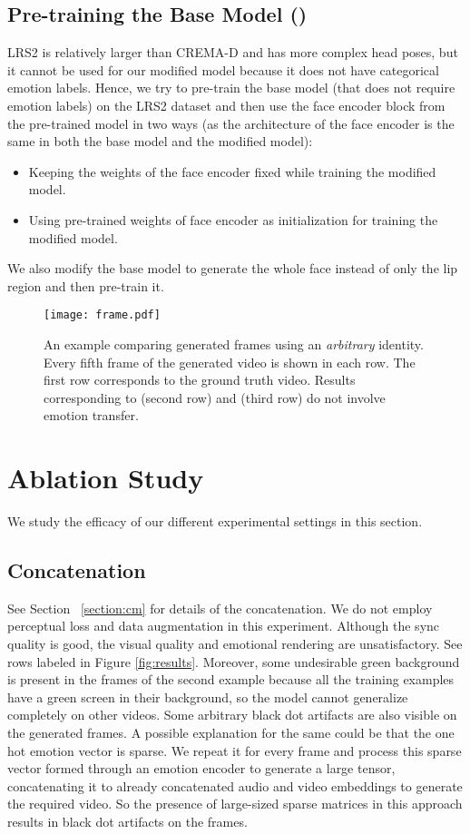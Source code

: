 \documentclass[accepted]{uai2023}
\begin{document}
\subsection{Pre-training the Base Model ()}
\label{section:pbm}
LRS2 \citep{afouras2018deep} is relatively larger than CREMA-D \citep{cao2014crema} and has more complex head poses, but it cannot be used for our modified model because it does not have categorical emotion labels. Hence, we try to pre-train the base model (that does not require emotion labels) on the LRS2 dataset and then use the face encoder block from the pre-trained model in two ways (as the architecture of the face encoder is the same in both the base model and the modified model):
\begin{itemize}
    \item Keeping the weights of the face encoder fixed while training the modified model.
    \item Using pre-trained weights of face encoder as initialization for training the modified model.
\end{itemize}
We also modify the base model to generate the whole face instead of only the lip region and then pre-train it.



\begin{figure*}[t]
\texttt{[image: frame.pdf]}
\caption{An example comparing generated frames using an \emph{arbitrary} identity. Every fifth frame of the generated video is shown in each row. 
The first row corresponds to the ground truth video. Results corresponding to \citep{wang2021audio2head} (second row) and \citep{prajwal2020lip} (third row) do not involve emotion transfer.}
\label{fig:frame}
\end{figure*}

\section{Ablation Study}
\label{section:r}
We study the efficacy of our different experimental settings in this section.
\subsection{ Concatenation}
See Section ~\ref{section:cm} for details of the  concatenation. We do not employ perceptual loss and data augmentation in this experiment. Although the sync quality is good, the visual quality and emotional rendering are unsatisfactory. See rows labeled  in Figure \ref{fig:results}. Moreover, some undesirable green background is present in the frames of the second example because all the training examples have a green screen in their background, so the model cannot generalize completely on other videos. Some arbitrary black dot artifacts are also visible on the generated frames. A possible explanation for the same could be that the one hot emotion vector is sparse. We repeat it for every frame and process this sparse vector formed through an emotion encoder to generate a large tensor, concatenating it to already concatenated audio and video embeddings to generate the required video. So the presence of large-sized sparse matrices in this approach results in black dot artifacts on the frames.
\end{document}
